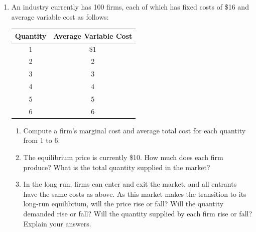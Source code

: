 \documentclass{article}
\begin{document}
\begin{enumerate}
	\begin{enumerate}
	
	\item Compute each producer's total cost and average total cost for each quantity from 1 to 6 pies.
	
	\item The price of a pie is now \$11. How many pies are sold? How many pies does each producer make? How many producers are there? How much profit does each producer earn?
	
	\item Is the situation described in part (b) a long-run equilibrium? Why or why not?
	
	\item Suppose that in the long run, there is free entry and exit. How much profit does each producer earn in the long-run equilibrium? What is the market price? How many pies does each producer make? How many pies are sold in the market? How many pie producers are operating?
	
	\end{enumerate}
	
\item An industry currently has 100 firms, each of which has fixed costs of \$16 and average variable cost as follows:

	\begin{center}
	\begin{tabular}{c | c}
	Quantity & Average Variable Cost \\
	\hline
	1 & \$1 \\
	2 & 2 \\
	3 & 3 \\
	4 & 4 \\
	5 & 5 \\
	6 & 6
	\end{tabular}
	\end{center}
	
	\begin{enumerate}
	
	\item Compute a firm's marginal cost and average total cost for each quantity from 1 to 6.
	
	\item The equilibrium price is currently \$10. How much does each firm produce? What is the total quantity supplied in the market?
	
	\item In the long run, firms can enter and exit the market, and all entrants have the same costs as above. As this market makes the transition to its long-run equilibrium, will the price rise or fall? Will the quantity demanded rise or fall? Will the quantity supplied by each firm rise or fall? Explain your answers.
	

\end{enumerate}
\end{enumerate}
\end{document}

